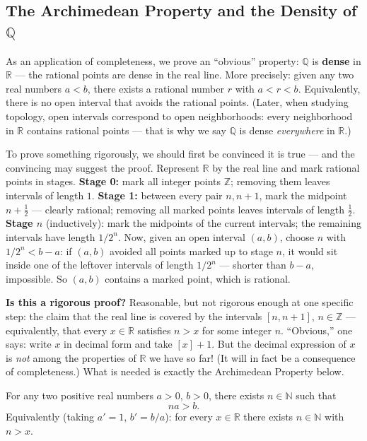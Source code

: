 \documentclass[11pt]{report}
\begin{document}
\subsection{The Archimedean Property and the Density of $\mathbb{Q}$}

As an application of completeness, we prove an ``obvious'' property: $\mathbb{Q}$ is \textbf{dense} in $\mathbb{R}$ --- the rational points are dense in the real line. More precisely: given any two real numbers $a < b$, there exists a rational number $r$ with $a < r < b$. Equivalently, there is no open interval that avoids the rational points. (Later, when studying topology, open intervals correspond to open neighborhoods: every neighborhood in $\mathbb{R}$ contains rational points --- that is why we say $\mathbb{Q}$ is dense \emph{everywhere} in $\mathbb{R}$.)

\begin{rembox}
To prove something rigorously, we should first be convinced it is true --- and the convincing may suggest the proof. Represent $\mathbb{R}$ by the real line and mark rational points in stages. \textbf{Stage 0:} mark all integer points $\mathbb{Z}$; removing them leaves intervals of length $1$. \textbf{Stage 1:} between every pair $n, n+1$, mark the midpoint $n + \tfrac{1}{2}$ --- clearly rational; removing all marked points leaves intervals of length $\tfrac{1}{2}$. \textbf{Stage $n$} (inductively): mark the midpoints of the current intervals; the remaining intervals have length $1/2^n$. Now, given an open interval $(a,b)$, choose $n$ with $1/2^n < b - a$: if $(a,b)$ avoided all points marked up to stage $n$, it would sit inside one of the leftover intervals of length $1/2^n$ --- shorter than $b - a$, impossible. So $(a,b)$ contains a marked point, which is rational.

\textbf{Is this a rigorous proof?} Reasonable, but not rigorous enough at one specific step: the claim that the real line is covered by the intervals $[n, n+1]$, $n \in \mathbb{Z}$ --- equivalently, that every $x \in \mathbb{R}$ satisfies $n > x$ for some integer $n$. ``Obvious,'' one says: write $x$ in decimal form and take $[x] + 1$. But the decimal expression of $x$ is \emph{not} among the properties of $\mathbb{R}$ we have so far! (It will in fact be a consequence of completeness.) What is needed is exactly the Archimedean Property below.
\end{rembox}

\begin{thmbox}
For any two positive real numbers $a > 0$, $b > 0$, there exists $n \in \mathbb{N}$ such that
\[
na > b.
\]
Equivalently (taking $a' = 1$, $b' = b/a$): for every $x \in \mathbb{R}$ there exists $n \in \mathbb{N}$ with $n > x$.
\end{thmbox}
\end{document}
